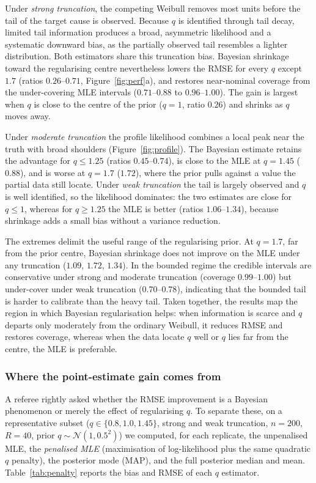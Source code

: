 \documentclass[ASNA,twocolumn]{USG}
\begin{document}
Under \emph{strong truncation}, the competing Weibull removes most units
before the tail of the target cause is observed. Because $q$ is identified
through tail decay, limited tail information produces a broad, asymmetric
likelihood and a systematic downward bias, as the partially observed tail
resembles a lighter distribution. Both estimators share this truncation
bias. Bayesian shrinkage toward the regularising centre nevertheless
lowers the RMSE for every $q$ except $1.7$ (ratios $0.26$--$0.71$,
Figure~\ref{fig:perf}a), and restores near-nominal coverage from the
under-covering MLE intervals ($0.71$--$0.88$ to $0.96$--$1.00$). The gain
is largest when $q$ is close to the centre of the prior ($q=1$, ratio
$0.26$) and shrinks as $q$ moves away.

Under \emph{moderate truncation} the profile likelihood combines a local
peak near the truth with broad shoulders (Figure~\ref{fig:profile}). The
Bayesian estimate retains the advantage for $q\le1.25$ (ratios
$0.45$--$0.74$), is close to the MLE at $q=1.45$ ($0.88$), and is worse
at $q=1.7$ ($1.72$), where the prior pulls against a value the partial
data still locate. Under \emph{weak truncation} the tail is largely
observed and $q$ is well identified, so the likelihood dominates: the two
estimates are close for $q\le1$, whereas for $q\ge1.25$ the MLE is better
(ratios $1.06$--$1.34$), because shrinkage adds a small bias without a
variance reduction.

The extremes delimit the useful range of the regularising prior. At
$q=1.7$, far from the prior centre, Bayesian shrinkage does not improve on
the MLE under any truncation ($1.09$, $1.72$, $1.34$). In the bounded
regime the credible intervals are conservative under strong and moderate
truncation (coverage $0.99$--$1.00$) but under-cover under weak truncation
($0.70$--$0.78$), indicating that the bounded tail is harder to calibrate
than the heavy tail. Taken together, the results map the region in which
Bayesian regularisation helps: when information is scarce and $q$ departs
only moderately from the ordinary Weibull, it reduces RMSE and restores
coverage, whereas when the data locate $q$ well or $q$ lies far from the
centre, the MLE is preferable.

\subsubsection{Where the point-estimate gain comes from}\label{sec:penalty}
A referee rightly asked whether the RMSE improvement is a Bayesian
phenomenon or merely the effect of regularising $q$. To separate these, on a
representative subset ($q\in\{0.8,1.0,1.45\}$, strong and weak truncation,
$n=200$, $R=40$, prior $q\sim\mathcal N(1,0.5^2)$) we computed, for each
replicate, the unpenalised MLE, the \emph{penalised MLE} (maximisation of
log-likelihood plus the same quadratic $q$ penalty), the posterior mode
(MAP), and the full posterior median and mean. Table~\ref{tab:penalty}
reports the bias and RMSE of each $q$ estimator.
\end{document}
